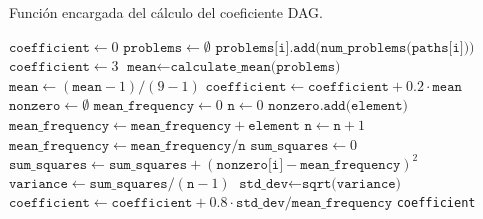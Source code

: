\begin{algorithm}
\caption{Función encargada del cálculo del coeficiente DAG.}\label{alg:dag}
\begin{algorithmic}[1]
\State $\texttt{coefficient} \gets 0$
\State $\texttt{problems} \gets \emptyset$ 
\State $\texttt{problems[i].add(num\_problems(paths[i]))}$
\EndFor
{}
\State $\texttt{coefficient} \gets 3$
\Else
\State $\texttt{mean} \gets \texttt{calculate\_mean(problems)}$
\State $\texttt{mean} \gets (\texttt{mean} - 1) / (9-1)$ 
\State $\texttt{coefficient} \gets \texttt{coefficient} + 0.2 \cdot \texttt{mean}$
\State $\texttt{nonzero} \gets \emptyset$
\State $\texttt{mean\_frequency} \gets 0$
\State $\texttt{n} \gets 0$
\State $\texttt{nonzero.add(element)}$
\State $\texttt{mean\_frequency} \gets \texttt{mean\_frequency} + \texttt{element}$
\State $\texttt{n} \gets \texttt{n}+1$
\EndIf
\EndFor
\EndFor
\State $\texttt{mean\_frequency} \gets \texttt{mean\_frequency}/\texttt{n}$
\State $\texttt{sum\_squares} \gets 0$
\State $\texttt{sum\_squares} \gets \texttt{sum\_squares} + (\texttt{nonzero[i]}-\texttt{mean\_frequency})^2$
\EndFor
\State $\texttt{variance} \gets \texttt{sum\_squares}/(\texttt{n}-1)$
\State $\texttt{std\_dev} \gets \texttt{sqrt(variance)}$
\State $\texttt{coefficient} \gets \texttt{coefficient} + 0.8 \cdot \texttt{std\_dev}/\texttt{mean\_frequency}$
\EndIf
\State \Return \texttt{coefficient}
\EndFunction
\end{algorithmic}
\end{algorithm}
